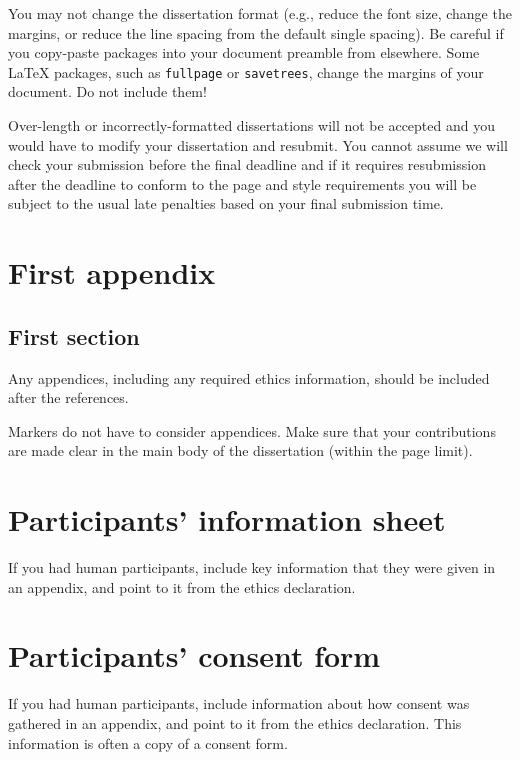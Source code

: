 \documentclass[logo,bsc,singlespacing,parskip,online]{infthesis}
\begin{document}
You may not change the dissertation format (e.g., reduce the font size, change
the margins, or reduce the line spacing from the default single spacing). Be
careful if you copy-paste packages into your document preamble from elsewhere.
Some \LaTeX{} packages, such as \texttt{fullpage} or \texttt{savetrees}, change
the margins of your document. Do not include them!

Over-length or incorrectly-formatted dissertations will not be accepted and you
would have to modify your dissertation and resubmit. You cannot assume we will
check your submission before the final deadline and if it requires resubmission
after the deadline to conform to the page and style requirements you will be
subject to the usual late penalties based on your final submission time.

% 




\appendix

\chapter{First appendix}

\section{First section}

Any appendices, including any required ethics information, should be included
after the references.

Markers do not have to consider appendices. Make sure that your contributions
are made clear in the main body of the dissertation (within the page limit).

\chapter{Participants' information sheet}

If you had human participants, include key information that they were given in
an appendix, and point to it from the ethics declaration.

\chapter{Participants' consent form}

If you had human participants, include information about how consent was
gathered in an appendix, and point to it from the ethics declaration.
This information is often a copy of a consent form.
\end{document}
